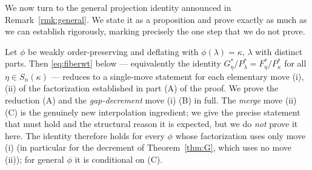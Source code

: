 \bigskip

We now turn to the general projection identity announced in
Remark~\ref{rmk:general}. We state it as a proposition and prove exactly as much as
we can establish rigorously, marking precisely the one step that we do not prove.

\begin{qthreeproposition}\label{prop:general}
Let $\phi$ be weakly order-preserving and deflating with $\phi(\lambda)=\kappa$,
$\lambda$ with distinct parts. Then \eqref{eq:fiberwt} below --- equivalently the
identity $G^*_\eta/P^*_\lambda=F^*_\eta/P^*_\kappa$ for all $\eta\in S_n(\kappa)$ ---
reduces to a single-move statement for each elementary move \textup{(i)},
\textup{(ii)} of the factorization established in part \textup{(A)} of the proof. We
prove the reduction \textup{(A)} and the \emph{gap-decrement} move \textup{(i)}
\textup{(B)} in full. The \emph{merge} move \textup{(ii)} \textup{(C)} is the
genuinely new interpolation ingredient; we give the precise statement that must hold
and the structural reason it is expected, but we do \emph{not} prove it here. The
identity therefore holds for every $\phi$ whose factorization uses only move
\textup{(i)} (in particular for the decrement of Theorem~\ref{thm:G}, which uses no
move \textup{(ii)}); for general $\phi$ it is conditional on \textup{(C)}.
\end{qthreeproposition}

